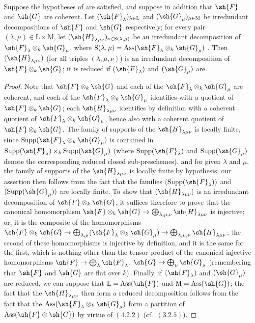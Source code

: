 \begin{proposition}[4.2.9]
\label{IV.4.2.9}
Suppose the hypotheses of  are satisfied, and suppose in addition that $\sh{F}$ and $\sh{G}$ are coherent.
Let $(\sh{F}_\lambda)_{\lambda\in\mathrm{L}}$ and $(\sh{G}_\mu)_{\mu\in\mathrm{M}}$ be irredundant decompositions of $\sh{F}$ and $\sh{G}$ respectively; for every pair $(\lambda,\mu)\in\mathrm{L}\times\mathrm{M}$, let $(\sh{H}_{\lambda\mu\nu})_{\nu\in\mathrm{S}(\lambda,\mu)}$ be an irredundant decomposition of $\sh{F}_\lambda\otimes_k\sh{G}_\mu$, where $\mathrm{S}(\lambda,\mu)=\operatorname{Ass}(\sh{F}_\lambda\otimes_k\sh{G}_\mu)$ .
Then $(\sh{H}_{\lambda\mu\nu})$ (for all triples $(\lambda,\mu,\nu)$) is an irredundant decomposition of $\sh{F}\otimes_k\sh{G}$; it is reduced if $(\sh{F}_\lambda)$ and $(\sh{G}_\mu)$ are.
\end{proposition}

\begin{proof}
Note that $\sh{F}\otimes_k\sh{G}$ and each of the $\sh{F}_\lambda\otimes_k\sh{G}_\mu$ are coherent, and each of the $\sh{F}_\lambda\otimes_k\sh{G}_\mu$ identifies with a quotient of $\sh{F}\otimes_k\sh{G}$; each $\sh{H}_{\lambda\mu\nu}$ identifies by definition with a coherent quotient of $\sh{F}_\lambda\otimes_k\sh{G}_\mu$, hence also with a coherent quotient of $\sh{F}\otimes_k\sh{G}$.
The family of supports of the $\sh{H}_{\lambda\mu\nu}$ is locally finite, since $\operatorname{Supp}(\sh{F}_\lambda\otimes_k\sh{G}_\mu)$ is contained in $\operatorname{Supp}(\sh{F}_\lambda)\times_k\operatorname{Supp}(\sh{G}_\mu)$ (where $\operatorname{Supp}(\sh{F}_\lambda)$ and $\operatorname{Supp}(\sh{G}_\mu)$ denote the corresponding reduced closed sub-preschemes), and for given $\lambda$ and $\mu$, the family of supports of the $\sh{H}_{\lambda\mu\nu}$ is locally finite by hypothesis; our assertion then follows from the fact that the families $(\operatorname{Supp}(\sh{F}_\lambda))$ and $(\operatorname{Supp}(\sh{G}_\mu))$ are locally finite.
To show that $(\sh{H}_{\lambda\mu\nu})$ is an irredundant decomposition of $\sh{F}\otimes_k\sh{G}$, it suffices therefore to prove that the canonical homomorphism $\sh{F}\otimes_k\sh{G}\to\bigoplus_{\lambda,\mu,\nu}\sh{H}_{\lambda\mu\nu}$ is injective; or, it is the composite of the homomorphisms $\sh{F}\otimes_k\sh{G}\to\bigoplus_{\lambda,\mu}(\sh{F}_\lambda\otimes_k\sh{G}_\mu)\to\bigoplus_{\lambda,\mu,\nu}\sh{H}_{\lambda\mu\nu}$; the second of these homomorphisms is injective by definition, and it is the same for the first, which is nothing other than the tensor product of the canonical injective homomorphisms $\sh{F}\to\bigoplus_\lambda\sh{F}_\lambda$, $\sh{G}\to\bigoplus_\mu\sh{G}_\mu$ (remembering that $\sh{F}$ and $\sh{G}$ are flat over $k$).
Finally, if $(\sh{F}_\lambda)$ and $(\sh{G}_\mu)$ are reduced, we can suppose that $\mathrm{L}=\operatorname{Ass}(\sh{F})$ and $\mathrm{M}=\operatorname{Ass}(\sh{G})$; the fact that the $\sh{H}_{\lambda\mu\nu}$ then form a reduced decomposition follows from the fact that the $\operatorname{Ass}(\sh{F}_\lambda\otimes_k\sh{G}_\mu)$ form a partition of $\operatorname{Ass}(\sh{F}\otimes\sh{G})$ by virtue of $(4.2.2)$ (cf.\ $(3.2.5)$).
\end{proof}

